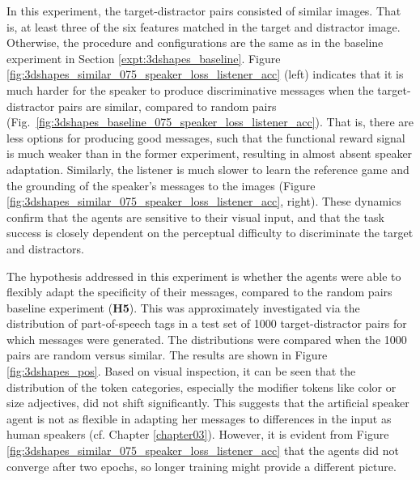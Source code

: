 In this experiment, the target-distractor pairs consisted of similar images. That is, at least three of the six features matched in the target and distractor image. Otherwise, the procedure and configurations are the same as in the baseline experiment in Section \ref{expt:3dshapes_baseline}. 
Figure \ref{fig:3dshapes_similar_075_speaker_loss_listener_acc} (left) indicates that it is much harder for the speaker to produce discriminative messages when the target-distractor pairs are similar, compared to random pairs (Fig.~\ref{fig:3dshapes_baseline_075_speaker_loss_listener_acc}). That is, there are less options for producing good messages, such that the functional reward signal is much weaker than in the former experiment, resulting in almost absent speaker adaptation. Similarly, the listener is much slower to learn the reference game and the grounding of the speaker's messages to the images (Figure \ref{fig:3dshapes_similar_075_speaker_loss_listener_acc}, right). These dynamics confirm that the agents are sensitive to their visual input, and that the task success is closely dependent on the perceptual difficulty to discriminate the target and distractors.

The hypothesis addressed in this experiment is whether the agents were able to flexibly adapt the specificity of their messages, compared to the random pairs baseline experiment (\textbf{H5}). This was approximately investigated via the distribution of part-of-speech tags in a test set of 1000 target-distractor pairs for which messages were generated. The distributions were compared when the 1000 pairs are random versus similar. The results are shown in Figure \ref{fig:3dshapes_pos}. Based on visual inspection, it can be seen that the distribution of the token categories, especially the modifier tokens like color or size adjectives, did not shift significantly. This suggests that the artificial speaker agent is not as flexible in adapting her messages to differences in the input as human speakers (cf. Chapter \ref{chapter03}). However, it is evident from Figure \ref{fig:3dshapes_similar_075_speaker_loss_listener_acc} that the agents did not converge after two epochs, so longer training might provide a different picture. 

